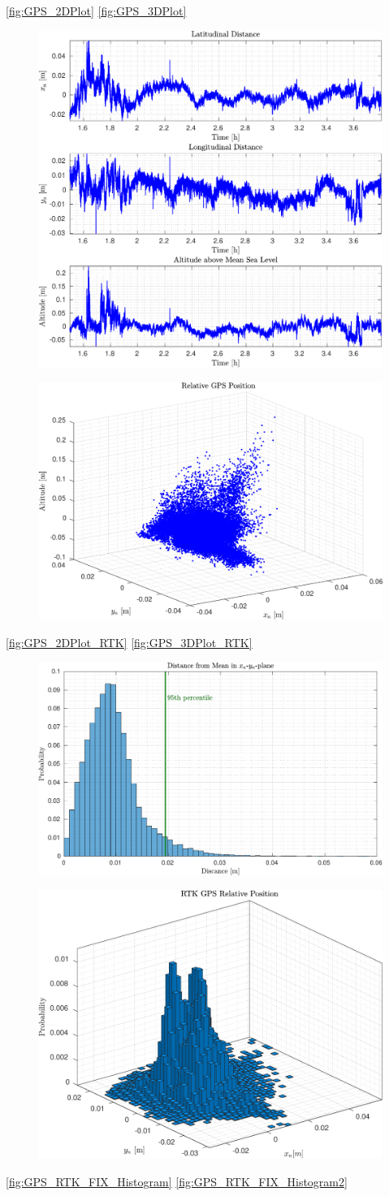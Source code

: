 \autoref{fig:GPS_2DPlot}
\autoref{fig:GPS_3DPlot}

\begin{figure}[H]
  \captionbox
  {
    
    \label{fig:GPS_2DPlot_RTK}
  }
  {
    \includegraphics[width=.45\textwidth]{figures/GPS_2DPlot_RTK}
  }
  \hspace{5pt}
  \captionbox
  {
    
    \label{fig:GPS_3DPlot_RTK}
  }
  {
    \includegraphics[width=.45\textwidth]{figures/GPS_3DPlot_RTK}
  }
\end{figure}

\autoref{fig:GPS_2DPlot_RTK}
\autoref{fig:GPS_3DPlot_RTK}

\begin{figure}[H]
  \captionbox
  {
    
    \label{fig:GPS_RTK_FIX_Histogram}
  }
  {
    \includegraphics[width=.45\textwidth]{figures/GPS_RTK_FIX_Histogram}
  }
  \hspace{5pt}
  \captionbox
  {
    
    \label{fig:GPS_RTK_FIX_Histogram2}
  }
  {
    \includegraphics[width=.45\textwidth]{figures/GPS_RTK_FIX_Histogram2}
  }
\end{figure}

\autoref{fig:GPS_RTK_FIX_Histogram}
\autoref{fig:GPS_RTK_FIX_Histogram2}


